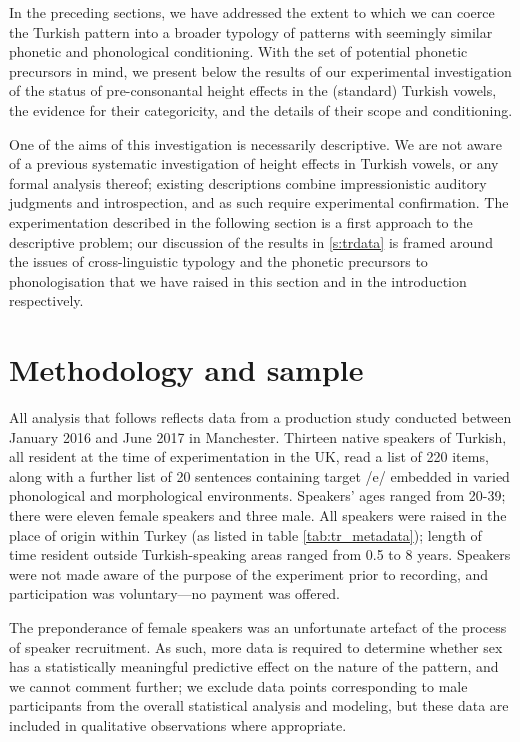 In the preceding sections, we have addressed the extent to which we can coerce the Turkish pattern into a broader typology of patterns with seemingly similar phonetic and phonological conditioning. With the set of potential phonetic precursors in mind, we present below the results of our experimental investigation of the status of pre-consonantal height effects in the (standard) Turkish vowels, the evidence for their categoricity, and the details of their scope and conditioning.

One of the aims of this investigation is necessarily descriptive. We are not aware of a previous systematic investigation of height effects in Turkish vowels, or any formal analysis thereof; existing descriptions combine impressionistic auditory judgments and introspection, and as such require experimental confirmation. The experimentation described in the following section is a first approach to the descriptive problem; our discussion of the results in \cref{s:trdata} is framed around the issues of cross-linguistic typology and the phonetic precursors to phonologisation that we have raised in this section and in the introduction respectively.

\section{Methodology and sample}\label{s:methods}

All analysis that follows reflects data from a production study conducted between January 2016 and June 2017 in Manchester. Thirteen native speakers of Turkish, all resident at the time of experimentation in the UK, read a list of 220 items, along with a further list of 20 sentences containing target /e/ embedded in varied phonological and morphological environments. Speakers' ages ranged from 20-39; there were eleven female speakers and three male. All speakers were raised in the place of origin within Turkey (as listed in table \ref{tab:tr_metadata}); length of time resident outside Turkish-speaking areas ranged from 0.5 to 8 years. Speakers were not made aware of the purpose of the experiment prior to recording, and participation was voluntary---no payment was offered.

The preponderance of female speakers was an unfortunate artefact of the process of speaker recruitment. As such, more data is required to determine whether sex has a statistically meaningful predictive effect on the nature of the pattern, and we cannot comment further; we exclude data points corresponding to male participants from the overall statistical analysis and modeling, but these data are included in qualitative observations where appropriate.

